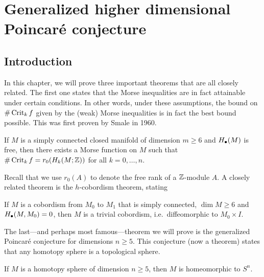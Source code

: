 \chapter[Generalized Poincaré conjecture]{Generalized higher dimensional Poincaré conjecture}
\label{chap:h-cobord}
\section{Introduction}

In this chapter, we will prove three important theorems that are all closely related.
The first one states that the Morse inequalities are in fact attainable under certain conditions.
In other words, under these assumptions, the bound on $\# \operatorname{Crit}_k f$ given by the (weak) Morse inequalities is in fact the best bound possible. This was first proven by Smale in 1960.
\begin{theorem}
    If $M$ is a simply connected closed manifold of dimension  $m \ge  6$ and $H_\bullet(M)$ is free, then there exists a Morse function on  $M$ such that  $\# \operatorname{Crit}_k f = r_0(H_k(M; \mathbb{Z}))$ for all $k = 0, \ldots, n$.
\end{theorem}
Recall that we use $r_0(A)$ to denote the free rank of a $\mathbb{Z}$-module $A$.
A closely related theorem is the $h$-cobordism theorem, stating
\begin{theorem}
    If $M$ is a cobordism from $M_0$ to $M_1$ that is simply connected, $\dim M \ge 6$ and $H_{\bullet}(M,M_0) = 0$, then $M$ is a trivial cobordism, i.e.\ diffeomorphic to  $ M_0 \times I$.
\end{theorem}
The last---and perhaps most famous---theorem we will prove is the generalized Poincaré conjecture for dimensions $n \ge 5$.
This conjecture (now a theorem) states that any homotopy sphere is a topological sphere.
\begin{theorem}
    If $M$ is a homotopy sphere of dimension  $n \ge 5$, then $M$ is homeomorphic to  $S^{n}$.
\end{theorem}

